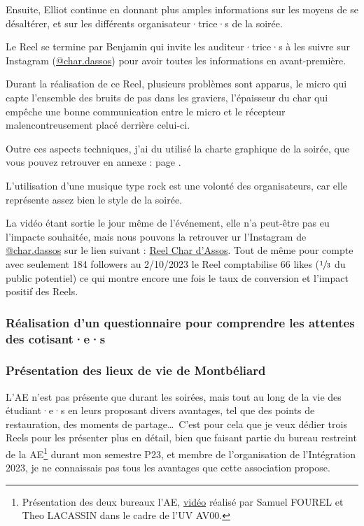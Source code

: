Ensuite, Elliot continue en donnant plus amples informations sur les moyens de se désaltérer, et sur les différents organisateur·trice·s de la soirée.

Le Reel se termine par Benjamin qui invite les auditeur·trice·s à les suivre sur Instagram (\href{https://www.instagram.com/char.dassos/}{@char.dassos}) pour avoir toutes les informations en avant-première.

Durant la réalisation de ce Reel, plusieurs problèmes sont apparus, le micro qui capte l'ensemble des bruits de pas dans les graviers, l'épaisseur du char qui empêche une bonne communication entre le micro et le récepteur malencontreusement placé derrière celui-ci.

Outre ces aspects techniques, j'ai du utilisé la charte graphique de la soirée, que vous pouvez retrouver en annexe : page \pageref{subsec:charte-char-dassos}.

L'utilisation d'une musique type rock est une volonté des organisateurs, car elle représente assez bien le style de la soirée.

La vidéo étant sortie le jour même de l'événement, elle n'a peut-être pas eu l'impacte souhaitée, mais nous pouvons la retrouver ur l'Instagram de \href{https://www.instagram.com/char.dassos/}{@char.dassos} sur le lien suivant : \href{https://www.instagram.com/reel/Cxuj5g2MKov/?utm_source=ig_web_button_share_sheet&igshid=MzRlODBiNWFlZA==}{Reel Char d'Assos}.
Tout de même pour compte avec seulement 184 followers au 2/10/2023 le Reel comptabilise 66 likes ($\sfrac{1}{3}$ du public potentiel) ce qui montre encore une fois le taux de conversion et l'impact positif des Reels.

\subsubsection{Réalisation d'un questionnaire pour comprendre les attentes des cotisant·e·s}

\subsubsection{Présentation des lieux de vie de Montbéliard}

L'\gls{AE} n'est pas présente que durant les soirées, mais tout au long de la vie des étudiant·e·s en leurs proposant divers avantages, tel que des points de restauration, des moments de partage\ldots\
C'est pour cela que je veux dédier trois Reels pour les présenter plus en détail, bien que faisant partie du bureau restreint de la \gls{AE}\footnote{Présentation des deux bureaux l'\gls{AE}, \href{https://www.instagram.com/reel/CeT9t0uAxrS/?utm_source=ig_web_copy_link&igshid=MzRlODBiNWFlZA==}{vidéo} réalisé par Samuel FOUREL et Theo LACASSIN dans le cadre de l'UV AV00.} durant mon semestre P23, et membre de l'organisation de l'Intégration 2023, je ne connaissais pas tous les avantages que cette association propose.

